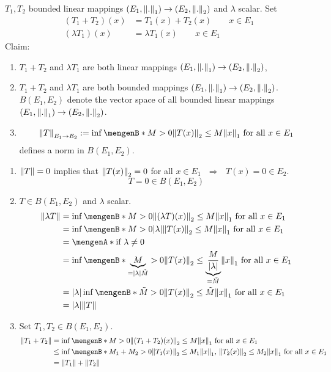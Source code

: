 \begin{satz*}

	$T_1,T_2$ bounded linear mappings $(E_1,\norm{.}_1) \to (E_2,\norm{.}_2)$ and $\lambda$ scalar. Set
	\begin{align*}
		(T_1+T_2)(x) &= T_1(x) + T_2(x) \qquad x \in E_1 \\
		( \lambda T_1)(x) &= \lambda T_1(x) \qquad x \in E_1
	\end{align*}
	Claim:
	\begin{enumerate}[(1)]
		\item $T_1 + T_2$ and $\lambda T_1$ are both linear mappings $(E_1,\norm{.}_1) \to (E_2,\norm{.}_2)$,
		\item $T_1 + T_2$ and $\lambda T_1$ are both bounded mappings $(E_1,\norm{.}_1) \to (E_2,\norm{.}_2)$. \\
		$B(E_1,E_2)$ denote the vector space of all bounded linear mappings $(E_1,\norm{.}_1) \to (E_2,\norm{.}_2)$.
		\item \[
			\norm{T}_{E_1 \to E_2} := \inf \set[M > 0]{\norm{T(x)}_2 \leq M \norm{x}_1 \text{ for all }x \in E_1}
		\]
		defines a norm in $B(E_1,E_2)$.
	\end{enumerate}
\end{satz*}
\begin{beweis}
	\begin{enumerate}[(1)]
		\item $\norm{T}=0$ implies that $\norm{T(x)}_2 = 0$ for all $x \in E_1$ $ \,\, \Rightarrow \,\, $ $T(x) = 0 \in E_2$.
		\[
			T = 0 \in B(E_1,E_2)
		\]
		\item $T \in B(E_1,E_2)$ and $\lambda$ scalar. 
		\begin{align*}
			\norm{\lambda T} &= \inf \set[M >0]{\norm{(\lambda T)(x)}_2 \leq M \norm{x}_1 \text{ for all }x \in E_1} \\
			&= \inf \set[M>0]{\abs{\lambda} \norm{T(x)}_2 \leq M \norm{x}_1 \text{ for all }x \in E_1} \\
			&= \set{\text{if }\lambda \neq 0} \\
			&= \inf \set[\underset{= \abs{\lambda} \tilde M}{\underbrace{M}}>0]{\norm{T(x)}_2 \leq \underset{= \tilde M}{\underbrace{\frac{M}{\abs{\lambda}}}}\norm{x}_1 \text{ for all }x \in E_1} \\
			&= \abs{\lambda} \inf \set[\tilde M >0]{ \norm{T(x)}_2 \leq \tilde M \norm{x}_1 \text{ for all }x \in E_1} \\
			&= \abs{\lambda} \norm{T}
		\end{align*}
		\item Set $T_1,T_2 \in B(E_1,E_2)$.
		\begin{align*}
			\norm{T_1+ T_2} &= \inf \set[M>0]{\norm{(T_1+T_2)(x)}_2 \leq M \norm{x}_1 \text{ for all }x \in E_1} \\
			&\leq \inf \set[M_1 + M_2>0]{\norm{T_1(x)}_2 \leq M_1 \norm{x}_1, \, \norm{T_2(x)}_2 \leq M_2 \norm{x}_1 \text{ for all }x \in E_1} \\
			&= \norm{T_1} + \norm{T_2}
		\end{align*}
	\end{enumerate}
\end{beweis}
